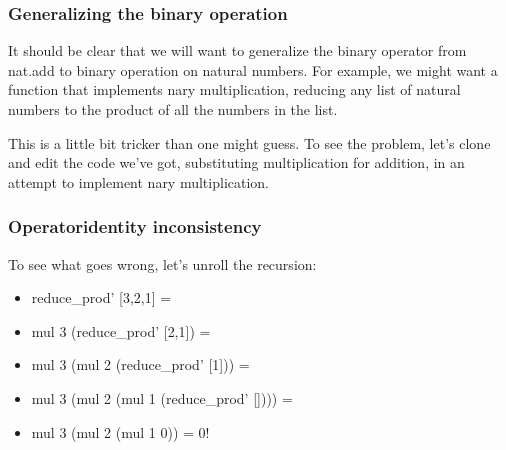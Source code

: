 \documentclass[letterpaper,10pt,english]{sphinxmanual}
\begin{document}
\subsubsection{Generalizing the binary operation}
\label{\detokenize{A_03_Recursive_Types:generalizing-the-binary-operation}}
\sphinxAtStartPar
It should be clear that we will want to generalize
the binary operator from nat.add to  binary
operation on natural numbers. For example, we might
want a function that implements n\sphinxhyphen{}ary multiplication,
reducing any list of natural numbers to the product
of all the numbers in the list.

\sphinxAtStartPar
This is a little bit tricker than one might guess.
To see the problem, let’s clone and edit the code
we’ve got, substituting multiplication for addition,
in an attempt to implement n\sphinxhyphen{}ary multiplication.

\begin{sphinxVerbatim}[commandchars=\\\{\}]
      
   
      

  \PYG{o}{[}\PYG{o}{]}   
\end{sphinxVerbatim}


\subsubsection{Operator\sphinxhyphen{}identity inconsistency}
\label{\detokenize{A_03_Recursive_Types:operator-identity-inconsistency}}
\sphinxAtStartPar
To see what goes wrong, let’s unroll the recursion:
\begin{itemize}
\item {} 
\sphinxAtStartPar
reduce\_prod’ {[}3,2,1{]} =

\item {} 
\sphinxAtStartPar
mul 3 (reduce\_prod’ {[}2,1{]}) =

\item {} 
\sphinxAtStartPar
mul 3 (mul 2 (reduce\_prod’ {[}1{]})) =

\item {} 
\sphinxAtStartPar
mul 3 (mul 2 (mul 1 (reduce\_prod’ {[}{]}))) =

\item {} 
\sphinxAtStartPar
mul 3 (mul 2 (mul 1 0)) = 0!

\end{itemize}
\end{document}
